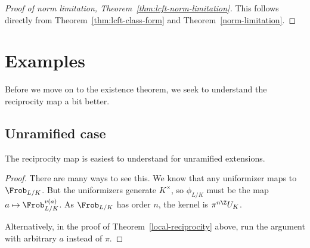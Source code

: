 \begin{proof}[Proof of norm limitation, Theorem~\ref{thm:lcft-norm-limitation}]
This follows directly from
Theorem~\ref{thm:lcft-class-form} %
and Theorem~\ref{norm-limitation}.
\end{proof}
\section{Examples}
Before we move on to the existence theorem, we seek to understand the reciprocity map a bit better. 
\subsection{Unramified case}
The reciprocity map is easiest to understand for unramified extensions.
\begin{proof}
There are many ways to see this. We know that any uniformizer maps to $\Frob_{L/K}$. But the uniformizers generate $K^{\times}$, so $\phi_{L/K}$ must be the map $a\mapsto \Frob_{L/K}^{v(a)}$. As $\Frob_{L/K}$ has order $n$, the kernel is $\pi^{n\Z}U_K$.

Alternatively, in the proof of Theorem~\ref{local-reciprocity} above, run the argument with arbitrary $a$ instead of $\pi$. 
\end{proof}
